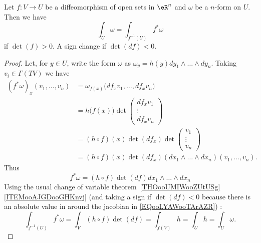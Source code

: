 \begin{lemma}       \label{LEMooNCYSooXtnCKq}
	Let \( f\colon V\to U\) be a diffeomorphism of open sets in \( \eR^n\) and \( \omega\) be a \( n\)-form on \( U\). Then we have
	\begin{equation}
		\int_U\omega=\int_{f^{-1}(U)}f^*\omega
	\end{equation}
	if \( \det(f)>0\). A sign change if \( \det(df)<0\).
\end{lemma}

\begin{proof}
	Let, for \( y\in U\), write the form \( \omega\) as \( \omega_y=h(y)dy_1\wedge\ldots\wedge dy_n\). Taking \( v_i\in \Gamma(TV)\) we have
	\begin{subequations}
		\begin{align}
			(f^*\omega)_x(v_1,\ldots, v_n) & =\omega_{f(x)}\big( df_xv_1,\ldots, df_xv_n \big)                       \\
			                               & =h\big( f(x) \big)\det\begin{pmatrix}
				                                                       df_xv_1 \\
				                                                       \vdots  \\
				                                                       df_xv_n
			                                                       \end{pmatrix}                                    \\
			                               & =(h\circ f)(x)\det(df_x)\det\begin{pmatrix}
				                                                             v_1    \\
				                                                             \vdots \\
				                                                             v_n
			                                                             \end{pmatrix}                              \\
			                               & =(h\circ f)(x)\det(df_x)(dx_1\wedge\ldots\wedge dx_n)(v_1,\ldots, v_n).
		\end{align}
	\end{subequations}
	Thus
	\begin{equation}
		f^*\omega= (h\circ f)\det(df)dx_1\wedge\ldots\wedge dx_n
	\end{equation}
	Using the usual change of variable theorem~\ref{THOooUMIWooZUtUSg}\ref{ITEMooAJGDooGHKnvj} (and taking a sign if \( \det(df)<0\) because there is an absolute value in around the jacobian in \eqref{EQooLYAWooTArAZR}) :
	\begin{equation}
		\int_{f^{-1}(U)}f^*\omega=\int_V(h\circ f)\det(df)=\int_{f(V)}h=\int_Uh=\int_U\omega.
	\end{equation}
\end{proof}

